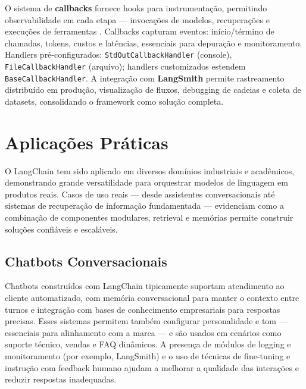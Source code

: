 \documentclass[12pt]{article}
\begin{document}
O sistema de \textbf{callbacks} fornece hooks para instrumentação, permitindo observabilidade em cada etapa — invocações de modelos, recuperações e execuções de ferramentas \cite{langchain2023docs}. Callbacks capturam eventos: início/término de chamadas, tokens, custos e latências, essenciais para depuração e monitoramento. Handlers pré-configurados: \texttt{StdOutCallbackHandler} (console), \texttt{FileCallbackHandler} (arquivo); handlers customizados estendem \texttt{BaseCallbackHandler}. A integração com \textbf{LangSmith} permite rastreamento distribuído em produção, visualização de fluxos, debugging de cadeias e coleta de datasets, consolidando o framework como solução completa.

\section{Aplicações Práticas}
\label{sec:aplicacoes}

O LangChain tem sido aplicado em diversos domínios industriais e acadêmicos, demonstrando grande versatilidade para orquestrar modelos de linguagem em produtos reais. Casos de uso reais — desde assistentes conversacionais até sistemas de recuperação de informação fundamentada — evidenciam como a combinação de componentes modulares, retrieval e memórias permite construir soluções confiáveis e escaláveis. \cite{langchain2023docs, langchain2023github}


\subsection{Chatbots Conversacionais}
\label{subsec:chatbots}

Chatbots construídos com LangChain tipicamente suportam atendimento ao cliente automatizado, com memória conversacional para manter o contexto entre turnos e integração com bases de conhecimento empresariais para respostas precisas. Esses sistemas permitem também configurar personalidade e tom — essenciais para alinhamento com a marca — e são usados em cenários como suporte técnico, vendas e FAQ dinâmicos. A presença de módulos de logging e monitoramento (por exemplo, LangSmith) e o uso de técnicas de fine-tuning e instrução com feedback humano ajudam a melhorar a qualidade das interações e reduzir respostas inadequadas. \cite{langchain2023docs, langsmith2023, ouyang2022training}
\end{document}
